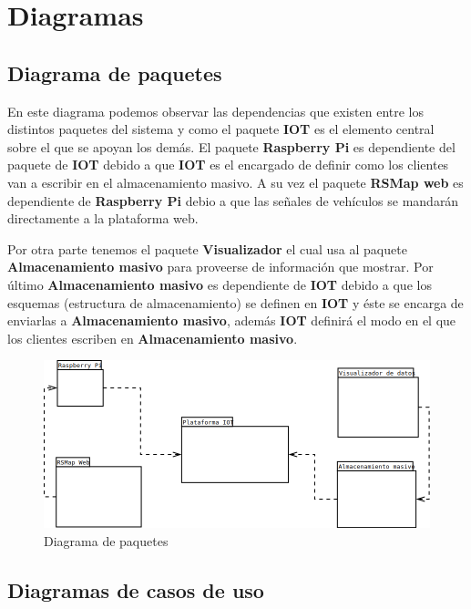 \section{Diagramas}
\subsection{Diagrama de paquetes}

En este diagrama podemos observar las dependencias que existen entre los distintos paquetes del sistema y como el paquete \textbf{IOT} es el elemento central sobre el que se apoyan los demás. El paquete \textbf{Raspberry Pi} es dependiente del paquete de \textbf{IOT} debido a que \textbf{IOT} es el encargado de definir como los clientes van a escribir en el almacenamiento masivo. A su vez el paquete \textbf{RSMap web} es dependiente de \textbf{Raspberry Pi} debio a que las señales de vehículos se mandarán directamente a la plataforma web.

Por otra parte tenemos el paquete \textbf{Visualizador} el cual usa al paquete \textbf{Almacenamiento masivo} para proveerse de información que mostrar. Por último \textbf{Almacenamiento masivo} es dependiente de \textbf{IOT} debido a que los esquemas (estructura de almacenamiento) se definen en \textbf{IOT} y éste se encarga de enviarlas a \textbf{Almacenamiento masivo}, además \textbf{IOT} definirá el modo en el que los clientes escriben en \textbf{Almacenamiento masivo}.

\begin{figure}[!ht]
  \begin{center}
    \includegraphics[scale=0.50]{../images/diag_plan/paquetes.png}
    \caption{Diagrama de paquetes}
    \label{fig:paquetes}
  \end{center}
\end{figure}

\newpage

\subsection{Diagramas de casos de uso}

